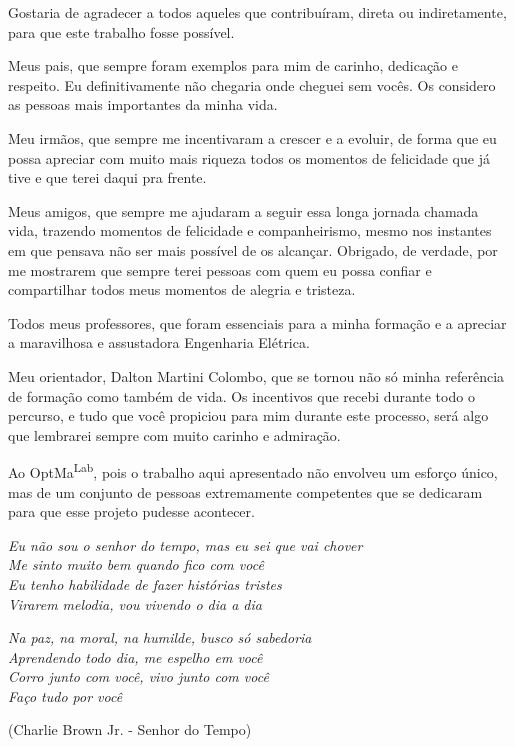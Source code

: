 \begin{agradecimentos}
Gostaria de agradecer a todos aqueles que contribuíram, direta ou indiretamente, para que este trabalho fosse possível.

Meus pais, que sempre foram exemplos para mim de carinho, dedicação e respeito. Eu definitivamente não chegaria onde cheguei sem vocês. Os considero as pessoas mais importantes da minha vida.

Meu irmãos, que sempre me incentivaram a crescer e a evoluir, de forma que eu possa apreciar com muito mais riqueza todos os momentos de felicidade que já tive e que terei daqui pra frente.

Meus amigos, que sempre me ajudaram a seguir essa longa jornada chamada vida, trazendo momentos de felicidade e companheirismo, mesmo nos instantes em que pensava não ser mais possível de os alcançar. Obrigado, de verdade, por me mostrarem que sempre terei pessoas com quem eu possa confiar e compartilhar todos meus momentos de alegria e tristeza.

Todos meus professores, que foram essenciais para a minha formação e a apreciar a maravilhosa e assustadora Engenharia Elétrica.

Meu orientador, Dalton Martini Colombo, que se tornou não só minha referência de formação como também de vida. Os incentivos que recebi durante todo o percurso, e tudo que você propiciou para mim durante este processo, será algo que lembrarei sempre com muito carinho e admiração.

Ao OptMa\textsuperscript{Lab}, pois o trabalho aqui apresentado não envolveu um esforço único, mas de um conjunto de pessoas extremamente competentes que se dedicaram para que esse projeto pudesse acontecer.

\end{agradecimentos}

\begin{epigrafe}
    \vspace*{\fill}
	\begin{flushright}
		\textit{Eu não sou o senhor do tempo, mas eu sei que vai chover\\
        Me sinto muito bem quando fico com você\\
        Eu tenho habilidade de fazer histórias tristes\\
        Virarem melodia, vou vivendo o dia a dia}
        
        \textit{
        Na paz, na moral, na humilde, busco só sabedoria\\
        Aprendendo todo dia, me espelho em você\\
        Corro junto com você, vivo junto com você\\
        Faço tudo por você}
        
        (Charlie Brown Jr. - Senhor do Tempo)
	\end{flushright}
\end{epigrafe}
